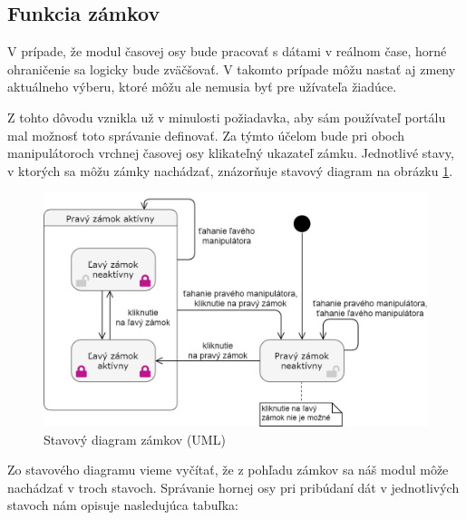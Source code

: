 \documentclass[
  printed, %
  twoside, %
  notable,   %
  nolof,   %
  nolot,   %
]{fithesis3}
\begin{document}
\subsection{Funkcia zámkov}
\label{sec:lockers}
V prípade, že modul časovej osy bude pracovať s dátami v reálnom čase, horné ohraničenie sa logicky bude zväčšovať. V takomto prípade môžu nastať aj zmeny aktuálneho výberu, ktoré môžu ale nemusia byť pre užívateľa žiadúce.

Z tohto dôvodu vznikla už v minulosti požiadavka, aby sám používateľ portálu mal možnosť toto správanie definovať. Za týmto účelom bude pri oboch manipulátoroch vrchnej časovej osy klikateľný ukazateľ zámku. Jednotlivé stavy, v ktorých sa môžu zámky nachádzať, znázorňuje stavový diagram na obrázku \ref{state_diagram}.

\begin{figure}[H]
	\center
	\includegraphics[width=1.0\linewidth]{state_diagram}
	\caption{Stavový diagram zámkov (UML)}
	\label{state_diagram}
\end{figure}

Zo stavového diagramu vieme vyčítať, že z pohľadu zámkov sa náš modul môže nachádzať v troch stavoch. Správanie hornej osy pri pribúdaní dát v jednotlivých stavoch nám opisuje nasledujúca tabuľka:
\end{document}
